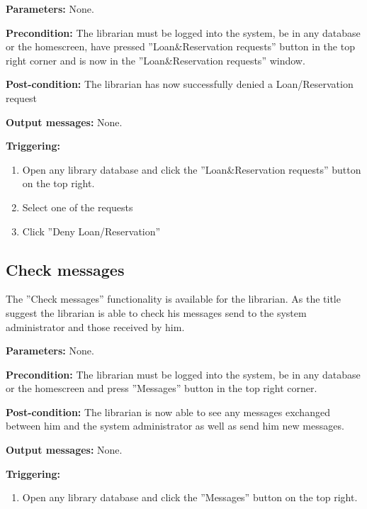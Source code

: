 \begin{description}

\item \textbf{Parameters:} None.

\item \textbf{Precondition:} The librarian must be logged into the system, be in
any database or the homescreen, have pressed ''Loan\&Reservation requests''
button in the top right corner and is now in the ''Loan\&Reservation requests''
window.

\item \textbf{Post-condition:} The librarian has now successfully denied a
Loan/Reservation request

\item \textbf{Output messages:} None.

\item \textbf{Triggering:}
\begin{enumerate}
\item Open any library database and click the ''Loan\&Reservation requests''
button on the top right.
\item Select one of the requests
\item Click ''Deny Loan/Reservation''
\end{enumerate}

\end{description}

\subsection{Check messages}

The ''Check messages'' functionality is available for the librarian.
As the title suggest the librarian is able to check his messages send to the
system administrator and those received by him.

\begin{description}

\item \textbf{Parameters:} None.

\item \textbf{Precondition:} The librarian must be logged into the system, be in
any database or the homescreen and press ''Messages'' button in the
top right corner.

\item \textbf{Post-condition:} The librarian is now able to see any messages
exchanged between him and the system administrator as well as send him new
messages.

\item \textbf{Output messages:} None.

\item \textbf{Triggering:}
\begin{enumerate}
\item Open any library database and click the ''Messages''
button on the top right.
\end{enumerate}

\end{description}

